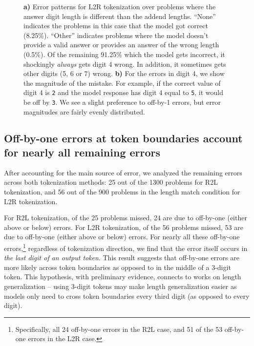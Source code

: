 \documentclass{article}
\theoremstyle{plain}
\theoremstyle{definition}
\theoremstyle{remark}
\begin{document}
\begin{figure}[ht]
\begin{subfigure}[t]{0.96\columnwidth}
    \end{subfigure}
    \vspace{-0.5em}
    \caption{\textbf{a)} Error patterns for L2R tokenization over problems where the answer digit length is different than the addend lengths. ``None'' indicates the problems in this case that the model got correct (8.25\%). ``Other'' indicates problems where the model doesn't provide a valid answer or provides an answer of the wrong length (0.5\%). Of the remaining 91.25\% which the model gets incorrect, it shockingly \textit{always} gets digit 4 wrong. In addition, it sometimes gets other digits (5, 6 or 7) wrong. \textbf{b)} For the errors in digit 4, we show the magnitude of the mistake. For example, if the correct value of digit 4 is \texttt{2} and the model response has digit 4 equal to \texttt{5}, it would be off by \texttt{3}. We see a slight preference to off-by-1 errors, but  error magnitudes are fairly evenly distributed.}
    \vspace{-1.5em}
    \label{fig:error_digit4}
\end{figure}

\subsection{Off-by-one errors at token boundaries account for nearly all remaining errors}
\label{sec:errors_rest}

After accounting for the main source of error, we analyzed the remaining errors across both tokenization methods: 25 out of the 1300 problems for R2L tokenization, and 56 out of the 900 problems in the length match condition for L2R tokenization.

For R2L tokenization, of the 25 problems missed, 24 are due to off-by-one (either above or below) errors. For L2R tokenization, of the 56 problems missed, 53 are due to off-by-one (either above or below) errors. For nearly all these off-by-one errors,\footnote{Specifically, all 24 off-by-one errors in the R2L case, and 51 of the 53 off-by-one errors in the L2R case.} regardless of tokenization direction, we find that the error itself occurs in \textit{the last digit of an output token}. This result suggests that off-by-one errors are more likely across token boundaries as opposed to in the middle of a 3-digit token. This hypothesis, with preliminary evidence, connects to works on length generalization \cite{anil2022exploring} -- using 3-digit tokens may make length generalization easier as models only need to cross token boundaries every third digit (as opposed to every digit).
\end{document}
